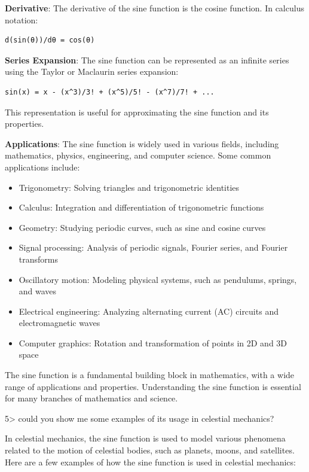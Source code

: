 \documentclass[
]{article}
\providecommand{\tightlist}{%
  \setlength{\itemsep}{0pt}\setlength{\parskip}{0pt}}
\begin{document}
\textbf{Derivative}: The derivative of the sine function is the cosine
function. In calculus notation:

\begin{verbatim}
d(sin(θ))/dθ = cos(θ)
\end{verbatim}

\textbf{Series Expansion}: The sine function can be represented as an
infinite series using the Taylor or Maclaurin series expansion:

\begin{verbatim}
sin(x) = x - (x^3)/3! + (x^5)/5! - (x^7)/7! + ...
\end{verbatim}

This representation is useful for approximating the sine function and
its properties.

\textbf{Applications}: The sine function is widely used in various
fields, including mathematics, physics, engineering, and computer
science. Some common applications include:

\begin{itemize}
\tightlist
\item
  Trigonometry: Solving triangles and trigonometric identities
\item
  Calculus: Integration and differentiation of trigonometric functions
\item
  Geometry: Studying periodic curves, such as sine and cosine curves
\item
  Signal processing: Analysis of periodic signals, Fourier series, and
  Fourier transforms
\item
  Oscillatory motion: Modeling physical systems, such as pendulums,
  springs, and waves
\item
  Electrical engineering: Analyzing alternating current (AC) circuits
  and electromagnetic waves
\item
  Computer graphics: Rotation and transformation of points in 2D and 3D
  space
\end{itemize}

The sine function is a fundamental building block in mathematics, with a
wide range of applications and properties. Understanding the sine
function is essential for many branches of mathematics and science.

5\textgreater{} could you show me some examples of its usage in
celestial mechanics?

In celestial mechanics, the sine function is used to model various
phenomena related to the motion of celestial bodies, such as planets,
moons, and satellites. Here are a few examples of how the sine function
is used in celestial mechanics:
\end{document}
